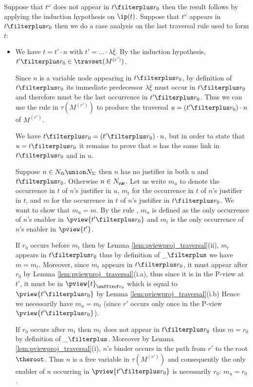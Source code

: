     Suppose that $t^\omega$ does not appear in $t \filterplus r_0$ then
    the result follows by applying the induction hypothesis on $\ip(t)$.
    Suppose that $t^\omega$ appears in $t \filterplus r_0$ then we do a case analysis on the last traversal rule used to form $t$:
    \begin{itemize}
    \item {}
        We have  $t = t' \cdot n$ with $t' = \ldots \cdot \lambda \overline{\xi}$. By the induction hypothesis, $t' \filterplus r_0 \in  \travset(M^{(r')})$.

        Since $n$ is a variable node appearing in $t\filterplus r_0$, by definition of $t\filterplus r_0$ its immediate predecessor 
        $\lambda \overline{\xi}$ must occur in $t\filterplus r_0$ and therefore must be the last occurrence in $t'\filterplus r_0$. Thus we can use the rule  in $\tau(M^{(r')})$ to produce the traversal $u = (t'\filterplus r_0) \cdot n$ of $M^{(r')}$.

        We have $t \filterplus r_0 = (t'\filterplus r_0) \cdot n$, but in order to state that $u = t \filterplus r_0$ it remains to prove that $n$ has the same link in $t \filterplus r_0$ and in $u$.

        Suppose $n \in N_@ \union N_\Sigma$ then $n$ has no justifier in both $u$ and $t\filterplus r_0$. Otherwise $n \in N_{\sf var}$. Let us write $m_u$ to denote the occurrence in $t$ of $n$'s justifier in $u$, $m_t$ for the occurrence in $t$ of $n$'s justifier in $t$, and $m$ for the occurrence in $t$ of $n$'s justifier in $t \filterplus r_0$. We want to show that $m_u = m$.
        By the rule , $m_u$ is defined as the only occurrence of $n$'s enabler in $\pview{t'\filterplus r_0}$ and $m_t$ is the only occurrence of $n$'s enabler in $\pview{t'}$.

        If $r_0$ occurs before $m_t$ then by Lemma \ref{lem:pviewproj_traversal}(ii), $m_t$ appears in $t \filterplus r_0$ thus by definition of $\_ \filterplus$ we have $m = m_t$. Moreover, since $m_t$ appears in $t\filterplus r_0$, it must appear
        after $r_0$ by Lemma \ref{lem:pviewproj_traversal}(i.a), thus since it is in the P-view at $t'$, it must be
        in $\pview{t}_{\suffixof r_0}$ which is equal to $\pview{t'\filterplus r_0}$ by Lemma \ref{lem:pviewproj_traversal}(i.b)
        Hence we necessarily have $m_u = m_t$ (since $r'$ occurs only once in the P-view $\pview{t'\filterplus r_0}$).

        If $r_0$ occurs after $m_t$ then $m_t$ does not appear in $t\filterplus r_0$ thus $m = r_0$ by definition of $\_ \filterplus$. Moreover by Lemma \ref{lem:pviewproj_traversal}(i), $n$'s binder occurs in the path from $r'$ to the root $\theroot$. Thus $n$ is a free variable in $\tau(M^{(r')})$ and consequently the only enabler of $n$ occurring in $\pview{t'\filterplus r_0}$ is necessarily $r_0$: $m_u = r_0$.


\end{itemize}
